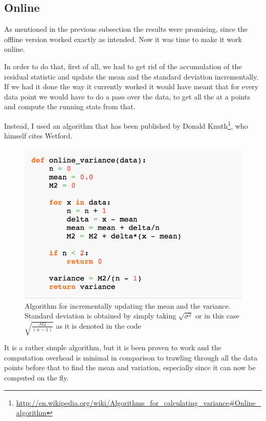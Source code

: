\documentclass[minf,twoside,singlespacing,parskip,frontabs,notimes,12pt]{infthesis} %
\begin{document}
\newpage
\subsection{Online}

As mentioned in the previous subsection the results were promising, since the offline version worked exactly as intended. 
Now it was time to make it work online. 

In order to do that, first of all, we had to get rid of the accumulation of the residual statistic and update the mean and the standard deviation incrementally. If we had it done the way it currently worked it would have meant that for every data point we would have to do a pass over the data, to get all the at a points and compute the running stats from that. 

Instead, I used an algorithm that has been published by Donald Knuth\footnote{\url{http://en.wikipedia.org/wiki/Algorithms\_for\_calculating\_variance#Online\_algorithm}}, who himself cites Wetford\cite{online-mean-and-var}. 



\begin{figure}[h!]
\begin{center}
\includegraphics[width=\textwidth]{online_algo}
\end{center}
\caption{Algorithm for incrementally updating the mean and the variance. Standard deviation is obtained by simply taking $\sqrt{\sigma^2}$ or in this case $\sqrt{\frac{M2}{(n-1)}}$ as it is denoted in the code}
\label{mean-formula}
\end{figure}


It is a rather simple algorithm, but it is been proven to work and the computation overhead is minimal in comparison to trawling through all the data points before that to find the mean and variation, especially since it can now be computed on the fly. 
\end{document}
